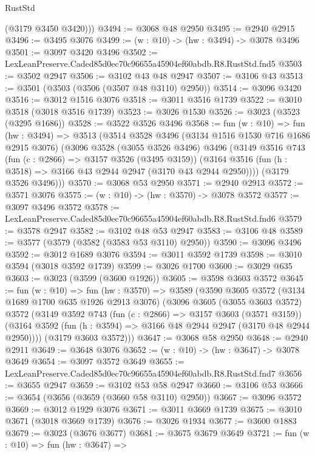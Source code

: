 \begin{lexlean}{RustStd}
\begin{coremodule}
        (@3179 @3450 @3420)))
@3494 := @3068 @48 @2950
@3495 := @2940 @2915
@3496 := @3495 @3076
@3499 := (w : @10) -> (hw : @3494) -> @3078 @3496
@3501 := @3097 @3420 @3496
@3502 := LexLeanPreserve.Caded85d0ec70c96655a45904ef60abdb.R8.RustStd.fnd5
@3503 := @3502 @2947
@3506 := @3102 @43 @48 @2947
@3507 := @3106 @43
@3513 := @3501 (@3503 (@3506 (@3507 @48 @3110) @2950))
@3514 := @3096 @3420
@3516 := @3012 @1516 @3076
@3518 := @3011 @3516 @1739
@3522 := @3010 @3518 (@3018 @3516 @1739)
@3523 := @3026 @1530
@3526 := @3023 (@3523 (@3295 @1686))
@3528 := @3522 @3526 @3496
@3568 := fun (w : @10) =>
  fun (hw : @3494) =>
  @3513
    (@3514
      @3528
      @3496
      (@3134 @1516 @1530 @716 @1686 @2915 @3076)
      (@3096
        @3528
        (@3055 @3526 @3496)
        @3496
        (@3149
          @3516
          @743
          (fun (c : @2866) => @3157 @3526 (@3495 @3159))
          (@3164 @3516 (fun (h : @3518) => @3166 @43 @2944 @2947 (@3170 @43 @2944 @2950))))
        (@3179 @3526 @3496)))
@3570 := @3068 @53 @2950
@3571 := @2940 @2913
@3572 := @3571 @3076
@3575 := (w : @10) -> (hw : @3570) -> @3078 @3572
@3577 := @3097 @3496 @3572
@3578 := LexLeanPreserve.Caded85d0ec70c96655a45904ef60abdb.R8.RustStd.fnd6
@3579 := @3578 @2947
@3582 := @3102 @48 @53 @2947
@3583 := @3106 @48
@3589 := @3577 (@3579 (@3582 (@3583 @53 @3110) @2950))
@3590 := @3096 @3496
@3592 := @3012 @1689 @3076
@3594 := @3011 @3592 @1739
@3598 := @3010 @3594 (@3018 @3592 @1739)
@3599 := @3026 @1700
@3600 := @3029 @635
@3603 := @3023 (@3599 (@3600 @1926))
@3605 := @3598 @3603 @3572
@3645 := fun (w : @10) =>
  fun (hw : @3570) =>
  @3589
    (@3590
      @3605
      @3572
      (@3134 @1689 @1700 @635 @1926 @2913 @3076)
      (@3096
        @3605
        (@3055 @3603 @3572)
        @3572
        (@3149
          @3592
          @743
          (fun (c : @2866) => @3157 @3603 (@3571 @3159))
          (@3164 @3592 (fun (h : @3594) => @3166 @48 @2944 @2947 (@3170 @48 @2944 @2950))))
        (@3179 @3603 @3572)))
@3647 := @3068 @58 @2950
@3648 := @2940 @2911
@3649 := @3648 @3076
@3652 := (w : @10) -> (hw : @3647) -> @3078 @3649
@3654 := @3097 @3572 @3649
@3655 := LexLeanPreserve.Caded85d0ec70c96655a45904ef60abdb.R8.RustStd.fnd7
@3656 := @3655 @2947
@3659 := @3102 @53 @58 @2947
@3660 := @3106 @53
@3666 := @3654 (@3656 (@3659 (@3660 @58 @3110) @2950))
@3667 := @3096 @3572
@3669 := @3012 @1929 @3076
@3671 := @3011 @3669 @1739
@3675 := @3010 @3671 (@3018 @3669 @1739)
@3676 := @3026 @1934
@3677 := @3600 @1883
@3679 := @3023 (@3676 @3677)
@3681 := @3675 @3679 @3649
@3721 := fun (w : @10) =>
  fun (hw : @3647) =>

\end{coremodule}
\end{lexlean}
